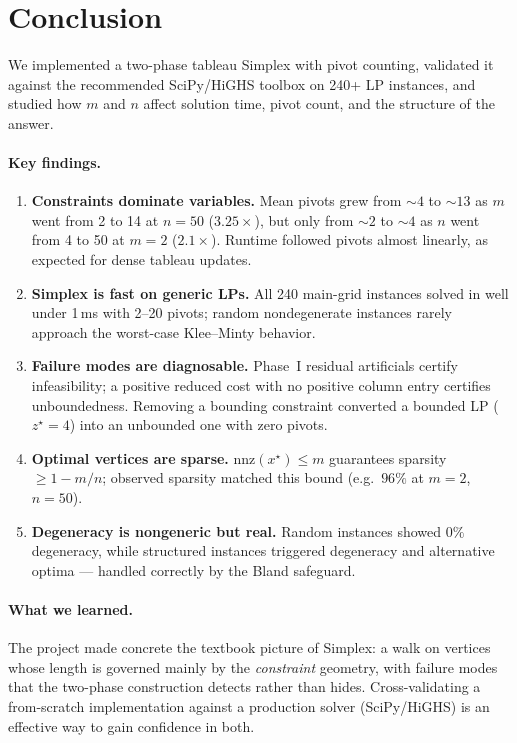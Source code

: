 \documentclass[10pt]{article}
\begin{document}
\section{Conclusion}
\label{sec:conclusion}

We implemented a two-phase tableau Simplex with pivot counting, validated it
against the recommended SciPy/HiGHS toolbox on 240+ LP instances, and
studied how $m$ and $n$ affect solution time, pivot count, and the structure
of the answer.

\paragraph{Key findings.}
\begin{enumerate}[nosep]
  \item \textbf{Constraints dominate variables.}  Mean pivots grew from
        $\sim\!4$ to $\sim\!13$ as $m$ went from 2 to 14 at $n=50$
        ($3.25\times$), but only from $\sim\!2$ to $\sim\!4$ as $n$ went
        from 4 to 50 at $m=2$ ($2.1\times$).  Runtime followed pivots
        almost linearly, as expected for dense tableau updates.
  \item \textbf{Simplex is fast on generic LPs.}  All 240 main-grid
        instances solved in well under 1\,ms with 2--20 pivots; random
        nondegenerate instances rarely approach the worst-case
        Klee--Minty behavior.
  \item \textbf{Failure modes are diagnosable.}  Phase~I residual
        artificials certify infeasibility; a positive reduced cost with no
        positive column entry certifies unboundedness.  Removing a bounding
        constraint converted a bounded LP ($z^\star=4$) into an unbounded
        one with zero pivots.
  \item \textbf{Optimal vertices are sparse.}  $\mathrm{nnz}(x^\star)\le m$
        guarantees sparsity $\ge 1-m/n$; observed sparsity matched this
        bound (e.g.\ $96\%$ at $m=2$, $n=50$).
  \item \textbf{Degeneracy is nongeneric but real.}  Random instances
        showed $0\%$ degeneracy, while structured instances triggered
        degeneracy and alternative optima --- handled correctly by the
        Bland safeguard.
\end{enumerate}

\paragraph{What we learned.}
The project made concrete the textbook picture of Simplex: a walk on
vertices whose length is governed mainly by the \emph{constraint} geometry,
with failure modes that the two-phase construction detects rather than
hides.  Cross-validating a from-scratch implementation against a production
solver (SciPy/HiGHS) is an effective way to gain confidence in both.
\end{document}
